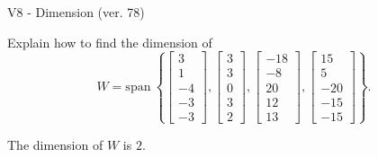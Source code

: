 \begin{exercise}
  \begin{exerciseTitle}V8 - Dimension (ver. 78)\end{exerciseTitle}
  \begin{exerciseStatement}
    Explain how to find the dimension of 
\[W=\mathrm{span}\ \left\{\left[\begin{array}{r}
3 \\
1 \\
-4 \\
-3 \\
-3
\end{array}\right] , \left[\begin{array}{r}
3 \\
3 \\
0 \\
3 \\
2
\end{array}\right] , \left[\begin{array}{r}
-18 \\
-8 \\
20 \\
12 \\
13
\end{array}\right] , \left[\begin{array}{r}
15 \\
5 \\
-20 \\
-15 \\
-15
\end{array}\right]\right\}.\]



  \end{exerciseStatement}
  \begin{exerciseAnswer}
   The dimension of \(W\) is  \(2\).
  


  \end{exerciseAnswer}
\end{exercise}